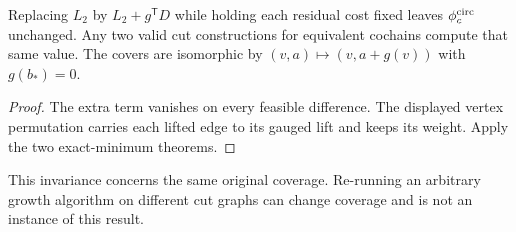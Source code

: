 \begin{corollary}\label{cor:cl-gauge}
Replacing $L_2$ by $L_2+g^{\mathsf T}D$ while holding each residual cost
fixed leaves $\phi_c^{\rm circ}$ unchanged. Any two valid cut constructions
for equivalent cochains compute that same value. The covers are isomorphic
by $(v,a)\mapsto(v,a+g(v))$ with $g(b_*)=0$.
\end{corollary}
\begin{proof}
The extra term vanishes on every feasible difference. The displayed
vertex permutation carries each lifted edge to its gauged lift and keeps
its weight. Apply the two exact-minimum theorems.
\end{proof}
This invariance concerns the same original coverage. Re-running an
arbitrary growth algorithm on different cut graphs can change coverage
and is not an instance of this result.

